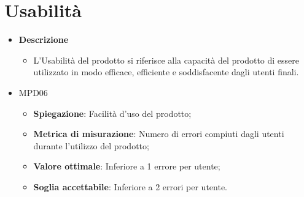 \section{Usabilità}

    \begin{itemize}
    \item \textbf{Descrizione}
    \begin{itemize}
    \item L'Usabilità del prodotto si riferisce alla capacità del prodotto di essere utilizzato in modo efficace, efficiente e soddisfacente dagli utenti finali.
    \end{itemize}

    \item MPD06
        \begin{itemize}
            \item \textbf{Spiegazione}: Facilità d'uso del prodotto;
            \item \textbf{Metrica di misurazione}: Numero di errori compiuti dagli utenti durante l'utilizzo del prodotto;
            \item \textbf{Valore ottimale}: Inferiore a 1 errore per utente;
            \item \textbf{Soglia accettabile}: Inferiore a 2 errori per utente.
        \end{itemize}
    \end{itemize}
    
